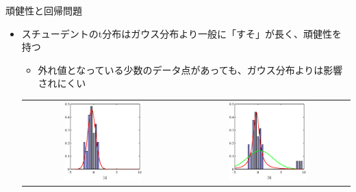 \begin{frame}{頑健性と回帰問題}
 \begin{itemize}
  \item スチューデントのt分布はガウス分布より一般に「すそ」が長く、\alert{頑健性}を持つ
        \begin{itemize}
         \item 外れ値となっている少数のデータ点があっても、ガウス分布よりは影響されにくい
        \end{itemize}
        \begin{tabular}[tb]{cc}
         \includegraphics[width=0.5\textwidth]{./figure/Figure2.16a.eps}
         &
         \includegraphics[width=0.5\textwidth]{./figure/Figure2.16b.eps}
        \end{tabular}
 \end{itemize}
\end{frame}

